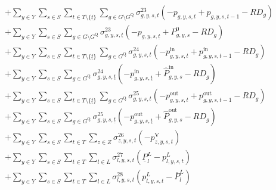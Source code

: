 \documentclass{article}
\newcommand{\sGenerators}{G}
\newcommand{\sStorage}{G^{\mathrm{Q}}}
\newcommand{\sYears}{Y}
\newcommand{\sScenarios}{S}
\newcommand{\sIntervals}{T}
\newcommand{\sZones}{Z}
\newcommand{\sLinks}{L}
\newcommand{\iGenerator}{g}
\newcommand{\iYear}{y}
\newcommand{\iScenario}{s}
\newcommand{\iInterval}{t}
\newcommand{\iIntervalStart}{\underline{\iInterval}}
\newcommand{\iZone}{z}
\newcommand{\iLink}{l}
\newcommand{\cRampRateDown}[1][\iGenerator]{RD_{#1}}
\newcommand{\cPowerFlowMin}{\underline{P}_{\iLink}^{L}}
\newcommand{\cPowerFlowMax}{\overline{P}_{\iLink}^{L}}
\newcommand{\cPowerInitial}[1][\iGenerator,\iYear,\iScenario]{P_{#1}^{0}}
\newcommand{\cPowerOutInitial}[1][\iGenerator,\iYear,\iScenario]{\hat{P}_{#1}^{\mathrm{out}}}
\newcommand{\cPowerInInitial}[1][\iGenerator,\iYear,\iScenario]{\hat{P}_{#1}^{\mathrm{in}}}
\newcommand{\vPower}[1][\iGenerator,\iYear,\iScenario,\iInterval]{p_{#1}}
\newcommand{\vPowerIn}[1][\iGenerator,\iYear,\iScenario,\iInterval]{p^{\mathrm{in}}_{#1}}
\newcommand{\vPowerOut}[1][\iGenerator,\iYear,\iScenario,\iInterval]{p^{\mathrm{out}}_{#1}}
\newcommand{\vPowerFlow}[1][\iLink,\iYear,\iScenario,\iInterval]{p^{\sLinks}_{#1}}
\newcommand{\vLostLoadPower}[1][\iZone,\iYear,\iScenario,\iInterval]{p^{\mathrm{V}}_{#1}}
\newcommand{\dRampRateDown}[1][\iGenerator,\iYear,\iScenario,\iInterval]{\sigma_{#1}^{23}}
\newcommand{\dRampRateDownStorageCharging}[1][\iGenerator,\iYear,\iScenario,\iInterval]{\sigma_{#1}^{24}}
\newcommand{\dRampRateDownStorageDischarging}[1][\iGenerator,\iYear,\iScenario,\iInterval]{\sigma_{#1}^{25}}
\newcommand{\dNonNegativeLostLoad}[1][\iZone,\iYear,\iScenario,\iInterval]{\sigma_{#1}^{26}}
\newcommand{\dMinPowerFlow}[1][\iLink,\iYear,\iScenario,\iInterval]{\sigma_{#1}^{27}}
\newcommand{\dMaxPowerFlow}[1][\iLink,\iYear,\iScenario,\iInterval]{\sigma_{#1}^{28}}
\begin{document}
\begin{align}
		& + \sum\limits_{\iYear \in \sYears}\sum\limits_{\iScenario \in \sScenarios}\sum\limits_{\iInterval \in \sIntervals \setminus \{\iIntervalStart\}} \sum\limits_{\iGenerator \in \sGenerators \setminus \sStorage} \dRampRateDown \left(- \vPower + \vPower[\iGenerator,\iYear,\iScenario,\iInterval-1] - \cRampRateDown\right)\\
		& + \sum\limits_{\iYear \in \sYears}\sum\limits_{\iScenario \in \sScenarios} \sum\limits_{\iGenerator \in \sGenerators \setminus \sStorage} \dRampRateDown[\iGenerator,\iYear,\iScenario,\iIntervalStart] \left(- \vPower[\iGenerator,\iYear,\iScenario,\iIntervalStart] + \cPowerInitial - \cRampRateDown\right)\\
		& +  \sum\limits_{\iYear \in \sYears}\sum\limits_{\iScenario \in \sScenarios} \sum\limits_{\iInterval \in \sIntervals \setminus \{\iIntervalStart\}} \sum\limits_{\iGenerator \in \sStorage} \dRampRateDownStorageCharging \left(- \vPowerIn + \vPowerIn[\iGenerator,\iYear,\iScenario,\iInterval-1] - \cRampRateDown\right) \\
		& +  \sum\limits_{\iYear \in \sYears}\sum\limits_{\iScenario \in \sScenarios} \sum\limits_{\iGenerator \in \sStorage} \dRampRateDownStorageCharging[\iGenerator,\iYear,\iScenario,\iIntervalStart] \left(- \vPowerIn[\iGenerator,\iYear,\iScenario,\iIntervalStart] + \cPowerInInitial - \cRampRateDown\right) \\
		& +  \sum\limits_{\iYear \in \sYears}\sum\limits_{\iScenario \in \sScenarios} \sum\limits_{\iInterval \in \sIntervals \setminus \{\iIntervalStart\}} \sum\limits_{\iGenerator \in \sStorage} \dRampRateDownStorageDischarging \left(- \vPowerOut + \vPowerOut[\iGenerator,\iYear,\iScenario,\iInterval-1] - \cRampRateDown\right) \\
		& +  \sum\limits_{\iYear \in \sYears}\sum\limits_{\iScenario \in \sScenarios} \sum\limits_{\iGenerator \in \sStorage} \dRampRateDownStorageDischarging[\iGenerator,\iYear,\iScenario,\iIntervalStart] \left(- \vPowerOut[\iGenerator,\iYear,\iScenario,\iIntervalStart] + \cPowerOutInitial - \cRampRateDown\right) \\
		& + \sum\limits_{\iYear \in \sYears}\sum\limits_{\iScenario \in \sScenarios}\sum\limits_{\iInterval \in \sIntervals} \sum\limits_{\iZone \in \sZones} \dNonNegativeLostLoad \left(- \vLostLoadPower\right)\\
		& + \sum\limits_{\iYear \in \sYears}\sum\limits_{\iScenario \in \sScenarios}\sum\limits_{\iInterval \in \sIntervals} \sum\limits_{\iLink \in \sLinks} \dMinPowerFlow \left(\cPowerFlowMin - \vPowerFlow\right)\\
		& + \sum\limits_{\iYear \in \sYears}\sum\limits_{\iScenario \in \sScenarios}\sum\limits_{\iInterval \in \sIntervals} \sum\limits_{\iLink \in \sLinks} \dMaxPowerFlow \left(\vPowerFlow - \cPowerFlowMax\right)\\\nonumber
\end{align}
\end{document}
